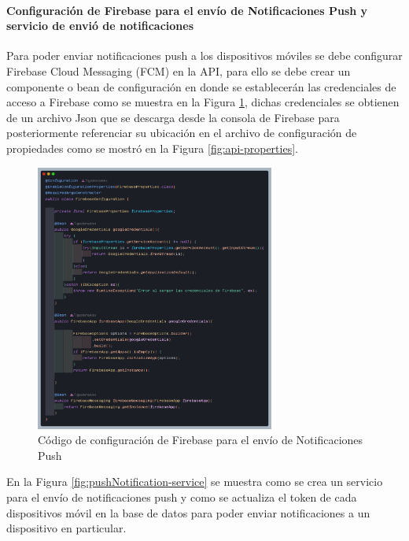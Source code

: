 \paragraph{Configuración de Firebase para el envío de Notificaciones Push y servicio de envió de notificaciones}

Para poder enviar notificaciones push a los dispositivos móviles se debe configurar Firebase Cloud Messaging (FCM) en la API, para ello se debe crear un componente o bean de configuración en donde se establecerán las credenciales de acceso a Firebase como se muestra en la Figura \ref{fig:firebase}, dichas credenciales se obtienen de un archivo Json que se descarga desde la consola de Firebase para posteriormente referenciar su ubicación en el archivo de configuración de propiedades como se mostró en la Figura \ref{fig:api-properties}.


\begin{figure}[H]
    \centering
    \includegraphics[width=0.7\textwidth]{resources/images/firebase}
    \caption{Código de configuración de Firebase para el envío de Notificaciones Push}
    \label{fig:firebase}
\end{figure}

En la Figura \ref{fig:pushNotification-service} se muestra como se crea un servicio para el envío de notificaciones push y como se actualiza  el token de cada dispositivos móvil en la base de datos para poder enviar notificaciones a un dispositivo en particular.

